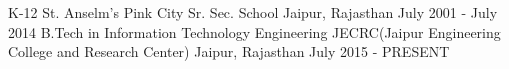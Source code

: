\begin{cventries}
\cventry
    {K-12}
    {St. Anselm's Pink City Sr. Sec. School }
    {Jaipur, Rajasthan}
    {July 2001 - July 2014}
    {
    }
  \cventry
    {B.Tech in Information Technology Engineering}
    {JECRC(Jaipur Engineering College and Research Center)}
    {Jaipur, Rajasthan}
    {July 2015 - PRESENT}
    {
    }
\end{cventries}
